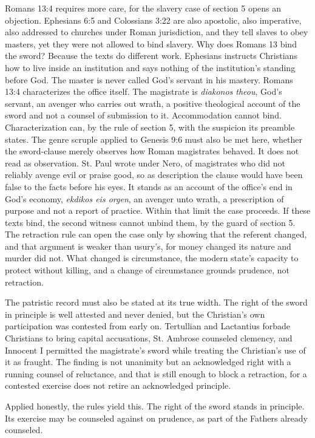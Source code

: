 \documentclass[11pt,twoside]{article}
\begin{document}
Romans 13:4 requires more care, for the slavery case of section 5 opens an objection. Ephesians 6:5 and Colossians 3:22 are also apostolic, also imperative, also addressed to churches under Roman jurisdiction, and they tell slaves to obey masters, yet they were not allowed to bind slavery. Why does Romans 13 bind the sword? Because the texts do different work. Ephesians instructs Christians how to live inside an institution and says nothing of the institution's standing before God. The master is never called God's servant in his mastery. Romans 13:4 characterizes the office itself. The magistrate is \emph{diakonos theou}, God's servant, an avenger who carries out wrath, a positive theological account of the sword and not a counsel of submission to it. Accommodation cannot bind. Characterization can, by the rule of section 5, with the suspicion its preamble states. The genre scruple applied to Genesis 9:6 must also be met here, whether the sword-clause merely observes how Roman magistrates behaved. It does not read as observation. St. Paul wrote under Nero, of magistrates who did not reliably avenge evil or praise good, so as description the clause would have been false to the facts before his eyes. It stands as an account of the office's end in God's economy, \emph{ekdikos eis orgen}, an avenger unto wrath, a prescription of purpose and not a report of practice. Within that limit the case proceeds. If these texts bind, the second witness cannot unbind them, by the guard of section 5. The retraction rule can open the case only by showing that the referent changed, and that argument is weaker than usury's, for money changed its nature and murder did not. What changed is circumstance, the modern state's capacity to protect without killing, and a change of circumstance grounds prudence, not retraction.

The patristic record must also be stated at its true width. The right of the sword in principle is well attested and never denied, but the Christian's own participation was contested from early on. Tertullian and Lactantius forbade Christians to bring capital accusations, St. Ambrose counseled clemency, and Innocent I permitted the magistrate's sword while treating the Christian's use of it as fraught. The finding is not unanimity but an acknowledged right with a running counsel of reluctance, and that is still enough to block a retraction, for a contested exercise does not retire an acknowledged principle.

Applied honestly, the rules yield this. The right of the sword stands in principle. Its exercise may be counseled against on prudence, as part of the Fathers already counseled.
\end{document}
